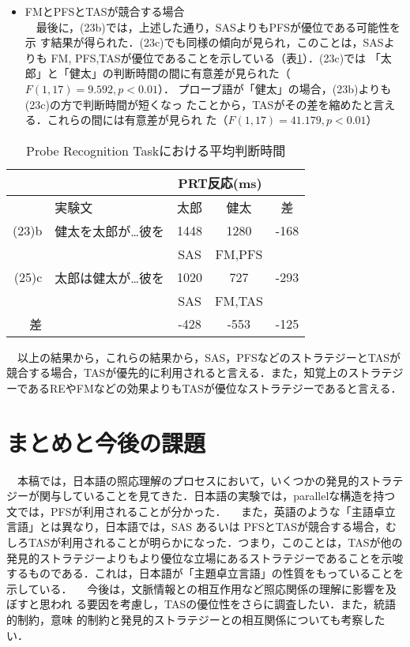 \begin{itemize}
  \item FMとPFSとTASが競合する場合\\
 　最後に，(23b)では，上述した通り，SASよりもPFSが優位である可能性を示
 す結果が得られた．(23c)でも同様の傾向が見られ，このことは，SASよりも
 FM, PFS,TASが優位であることを示している（表\ref{table:fmpfstas}）．(23c)では
 「太郎」と「健太」の判断時間の間に有意差が見られた（$F(1,17)=9.592,
 p<0.01$）．
 プローブ語が「健太」の場合，(23b)よりも(23c)の方で判断時間が短くなっ
 たことから，TASがその差を縮めたと言える．これらの間には有意差が見られ
 た（$F(1,17)=41.179, p<0.01$）
\end{itemize}

\begin{table}
\begin{center}
\caption{Probe Recognition Taskにおける平均判断時間}
\label{table:fmpfstas}
\begin{tabular}{|r|l|c|c|c|} \hline
    \multicolumn{2}{|c|}{} & \multicolumn{2}{c|}{PRT反応(ms)} &   \\ \hline
      & 実験文 & 太郎 & 健太 & 差 \\ \hline
(23)b & 健太を太郎が\ldots 彼を & 1448 & 1280 & -168 \\
      &                    & SAS & FM,PFS & \\ \hline
(25)c & 太郎は健太が\ldots 彼を & 1020 & 727 & -293\\
      &                    & SAS & FM,TAS & \\ \hline
  差  &                    & -428 & -553 & -125\\ \hline
\end{tabular}
\end{center}
\end{table}


　以上の結果から，これらの結果から，SAS，PFSなどのストラテジーとTASが競合する場合，TASが優先的に利用されると言える．また，知覚上のストラテジーであるREやFMなどの効果よりもTASが優位なストラテジーであると言える．

\section{まとめと今後の課題}

　本稿では，日本語の照応理解のプロセスにおいて，いくつかの発見的ストラテジーが関与していることを見てきた．日本語の実験では，parallelな構造を持つ文では，PFSが利用されることが分かった．
　また，英語のような「主語卓立言語」とは異なり，日本語では，SAS
あるいは
PFSとTASが競合する場合，むしろTASが利用されることが明らかになった．つまり，このことは，TASが他の発見的ストラテジーよりもより優位な立場にあるストラテジーであることを示唆するものである．これは，日本語が「主題卓立言語」の性質をもっていることを示している．
　今後は，文脈情報との相互作用など照応関係の理解に影響を及ぼすと思われ
る要因を考慮し，TASの優位性をさらに調査したい．また，統語的制約，意味
的制約と発見的ストラテジーとの相互関係についても考察したい．

